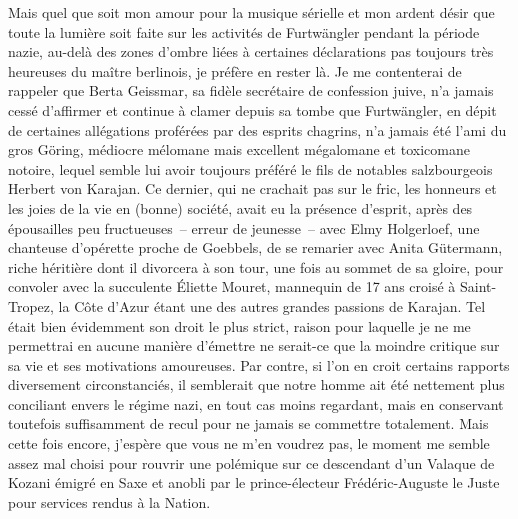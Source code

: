 %
Mais quel que soit mon amour pour la musique sérielle et mon ardent désir que toute la lumière soit faite sur les activités de Furtwängler pendant la période nazie, au-delà des zones d’ombre liées à certaines déclarations pas toujours très heureuses du maître berlinois, je préfère en rester là. Je me contenterai de rappeler que Berta Geissmar, sa fidèle secrétaire de confession juive, n’a jamais cessé d’affirmer et continue à clamer depuis sa tombe que Furtwängler, en dépit de certaines allégations proférées par des esprits chagrins, n’a jamais été l’ami du gros Göring, médiocre mélomane mais excellent mégalomane et toxicomane notoire, lequel semble lui avoir toujours préféré le fils de notables salzbourgeois Herbert von Karajan. Ce dernier, qui ne crachait pas sur le fric, les honneurs et les joies de la vie en (bonne) société, avait eu la présence d’esprit, après des épousailles peu fructueuses~-- erreur de jeunesse~-- avec Elmy Holgerloef, une chanteuse d’opérette proche de Goebbels, de se remarier avec Anita Gütermann, riche héritière dont il divorcera à son tour, une fois au sommet de sa gloire, pour convoler avec la succulente Éliette Mouret, mannequin de 17 ans croisé à Saint-Tropez, la Côte d’Azur étant une des autres grandes passions de Karajan. Tel était bien évidemment son droit le plus strict, raison pour laquelle je ne me permettrai en aucune manière d’émettre ne serait-ce que la moindre critique sur sa vie et ses motivations amoureuses. Par contre, si l’on en croit certains rapports diversement circonstanciés, il semblerait que notre homme ait été nettement plus conciliant envers le régime nazi, en tout cas moins regardant, mais en conservant toutefois suffisamment de recul pour ne jamais se commettre totalement. Mais cette fois encore, j’espère que vous ne m’en voudrez pas, le moment me semble assez mal choisi pour rouvrir une polémique sur ce descendant d’un Valaque de Kozani émigré en Saxe et anobli par le prince-électeur Frédéric-Auguste le Juste pour services rendus à la Nation.

